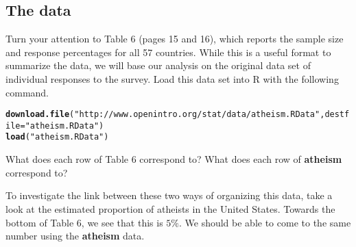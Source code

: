 \documentclass{article}\usepackage[]{graphicx}\usepackage[]{color}
\makeatletter
\newcommand{\hlstr}[1]{\textcolor[rgb]{0.192,0.494,0.8}{#1}}%
\newcommand{\hlopt}[1]{\textcolor[rgb]{0,0,0}{#1}}%
\newcommand{\hlstd}[1]{\textcolor[rgb]{0.345,0.345,0.345}{#1}}%
\newcommand{\hlkwb}[1]{\textcolor[rgb]{0.69,0.353,0.396}{#1}}%
\newcommand{\hlkwc}[1]{\textcolor[rgb]{0.333,0.667,0.333}{#1}}%
\newcommand{\hlkwd}[1]{\textcolor[rgb]{0.737,0.353,0.396}{\textbf{#1}}}%
\newenvironment{kframe}{%
 \def\at@end@of@kframe{}%
 \ifinner\ifhmode%
  \def\at@end@of@kframe{\end{minipage}}%
  \begin{minipage}{\columnwidth}%
 \fi\fi%
 \def\FrameCommand##1{\hskip\@totalleftmargin \hskip-\fboxsep
 \colorbox{shadecolor}{##1}\hskip-\fboxsep
     \hskip-\linewidth \hskip-\@totalleftmargin \hskip\columnwidth}%
 \MakeFramed {\advance\hsize-\width
   \@totalleftmargin\z@ \linewidth\hsize
   \@setminipage}}%
 {\par\unskip\endMakeFramed%
 \at@end@of@kframe}
\newenvironment{knitrout}{}{} %
\makeatother
\begin{document}
\subsection*{The data}
Turn your attention to Table 6 (pages 15 and 16), which reports the sample size and response percentages for all 57 countries. While this is a useful format to summarize the data, we will base our analysis on the original data set of individual responses to the survey. Load this data set into R with the following command.

\begin{knitrout}
\color{fgcolor}\begin{kframe}
\begin{alltt}
\hlkwd{download.file}\hlstd{(}\hlstr{"http://www.openintro.org/stat/data/atheism.RData"}\hlstd{,} \hlkwc{destfile} \hlstd{=} \hlstr{"atheism.RData"}\hlstd{)}
\hlkwd{load}\hlstd{(}\hlstr{"atheism.RData"}\hlstd{)}
\end{alltt}
\end{kframe}
\end{knitrout}


\begin{exercise}
What does each row of Table 6 correspond to? What does each row of \hlkwd{atheism} correspond to?
\end{exercise}

To investigate the link between these two ways of organizing this data, take a look at the estimated proportion of atheists in the United States. Towards the bottom of Table 6, we see that this is $5\%$. We should be able to come to the same number using the \hlkwd{atheism} data.

\end{document}
